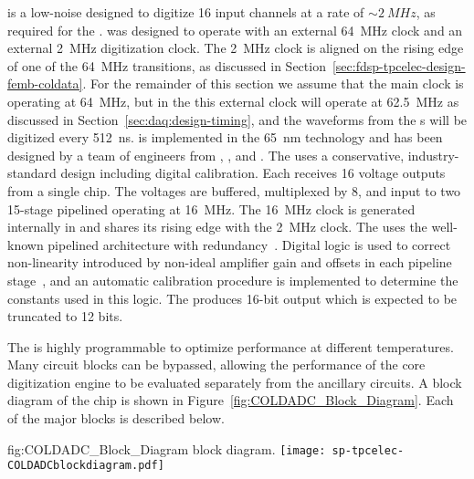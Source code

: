  is a low-noise   designed to digitize
\num{16} input channels at a rate of $\sim\SI{2}{MHz}$, as required for the
 .  was designed to operate with 
an external \SI{64}{MHz} clock and an external \SI{2}{MHz} digitization clock.
The \SI{2}{MHz} clock is aligned on the rising edge of one of
the \SI{64}{MHz} transitions, as discussed in Section~\ref{sec:fdsp-tpcelec-design-femb-coldata}.
For the remainder of this section we assume that the main clock is operating
at \SI{64}{MHz}, but in the   this external clock will operate at \SI{62.5}{MHz}
as discussed in Section~\ref{sec:daq:design-timing}, and the waveforms from
the s will be digitized every \SI{512}{ns}.
 is implemented in the 
\SI{65}{nm}  technology and has been designed by a team of engineers
from , , and .  The  uses a conservative,
industry-standard design including digital calibration.  Each 
receives \num{16} voltage outputs from a single  chip.  The voltages
are buffered, multiplexed by \num{8}, and input to two \num{15}-stage pipelined 
operating at \SI{16}{MHz}. The \SI{16}{MHz} clock is generated internally in
 and shares its rising edge with the \SI{2}{MHz} clock. 
The  uses the well-known pipelined architecture
with redundancy~\cite{PipelinedADC}.  Digital logic is used to correct non-linearity
introduced by non-ideal amplifier gain and offsets in each pipeline
stage~\cite{CalibrationCorrection}, and an automatic calibration procedure is
implemented to determine the constants used in this logic.  The  produces
\num{16}-bit output which is expected to be truncated to \num{12} bits.

The  is highly programmable to optimize performance at different
temperatures.  Many circuit blocks can be bypassed, allowing the performance 
of the core digitization engine to be evaluated separately from the ancillary 
circuits. A block diagram of the chip is shown in Figure~\ref{fig:COLDADC_Block_Diagram}. 
Each of the major blocks is described below.

\begin{dunefigure}
{fig:COLDADC_Block_Diagram}
{ block diagram.}
\texttt{[image: sp-tpcelec-COLDADCblockdiagram.pdf]}
\end{dunefigure}


